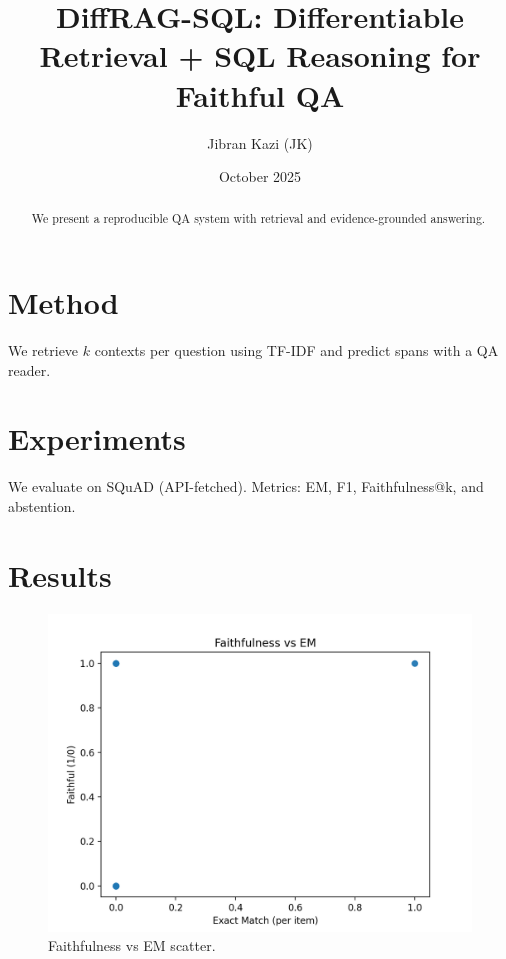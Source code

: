 \documentclass[10pt]{article}
\title{DiffRAG-SQL: Differentiable Retrieval + SQL Reasoning for Faithful QA}
\author{Jibran Kazi (JK)}
\date{October 2025}
\begin{document}
\maketitle
\begin{abstract}
We present a reproducible QA system with retrieval and evidence-grounded answering.
\end{abstract}
\section{Method}
We retrieve $k$ contexts per question using TF-IDF and predict spans with a QA reader.
\section{Experiments}
We evaluate on SQuAD (API-fetched). Metrics: EM, F1, Faithfulness@k, and abstention.
\section{Results}

\begin{figure}[h]
\centering
\includegraphics[width=0.6\linewidth]{figures/faith_vs_em.png}
\caption{Faithfulness vs EM scatter.}
\end{figure}
\end{document}
